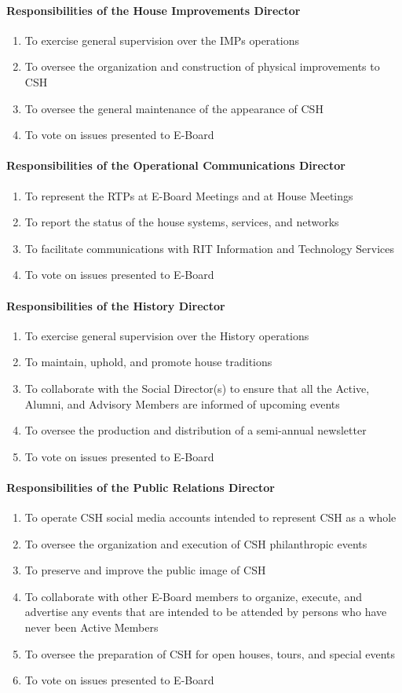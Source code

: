 \documentclass{article}
\newcommand{\asubsubsection}[1]{\paragraph{#1} \label{#1}}
\begin{document}
\asubsubsection{Responsibilities of the House Improvements Director}
\begin{enumerate}
	\item To exercise general supervision over the IMPs operations
	\item To oversee the organization and construction of physical improvements to CSH
	\item To oversee the general maintenance of the appearance of CSH
	\item To vote on issues presented to E-Board
\end{enumerate}

\asubsubsection{Responsibilities of the Operational Communications Director}
\begin{enumerate}
	\item To represent the RTPs at E-Board Meetings and at House Meetings
	\item To report the status of the house systems, services, and networks
	\item To facilitate communications with RIT Information and Technology Services
	\item To vote on issues presented to E-Board
\end{enumerate}

\asubsubsection{Responsibilities of the History Director}
\begin{enumerate}
	\item To exercise general supervision over the History operations
	\item To maintain, uphold, and promote house traditions
	\item To collaborate with the Social Director(s) to ensure that all the Active, Alumni, and Advisory Members are informed of upcoming events
	\item To oversee the production and distribution of a semi-annual newsletter
	\item To vote on issues presented to E-Board
\end{enumerate}

\asubsubsection{Responsibilities of the Public Relations Director}
\begin{enumerate}
	\item To operate CSH social media accounts intended to represent CSH as a whole
	\item To oversee the organization and execution of CSH philanthropic events
	\item To preserve and improve the public image of CSH
	\item To collaborate with other E-Board members to organize, execute, and advertise any events that are intended to be attended by persons who have never been Active Members
	\item To oversee the preparation of CSH for open houses, tours, and special events
	\item To vote on issues presented to E-Board
\end{enumerate}
\end{document}
